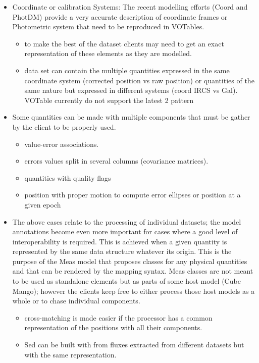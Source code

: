 \begin{itemize}
  \item Coordinate or calibration Systems: The recent modelling efforts (Coord and PhotDM) provide a very accurate description of coordinate frames or Photometric system that need to be reproduced in VOTables.
  \begin{itemize}
    \item to make the best of the dataset  clients may need to get an exact representation of these elements as they are modelled.
    \item data set can contain the multiple quantities expressed in the same coordinate system (corrected position vs raw position) or 
             quantities of the same nature but expressed in different systems (coord IRCS vs Gal). VOTable currently do not support the latest 2 pattern
  \end{itemize} 
  
  \item Some quantities can be made with multiple components that must be gather by the client to be properly used.
  \begin{itemize}
    \item value-error associations. 
    \item errors values split in several columns (covariance matrices). 
    \item quantities with quality flags
    \item position with proper motion to compute error ellipses or position at a given epoch
  \end{itemize} 

  \item The above cases relate to the processing of individual datasets; the model annotations become even more important for cases where a good level of interoperability is required. 
           This is achieved when a given quantity is represented by the same data structure whatever its origin. This is the purpose of the Meas model that proposes classes for 
           any physical quantities and that can be rendered by the mapping syntax. Meas classes are not meant to be used as standalone elements but as parts of some host model (Cube Mango);
           however the clients keep free to either process those host models as a whole or to chase individual components.
    \begin{itemize}
      \item cross-matching is made easier if the processor has a common representation of the positions with all their components.
      \item Sed can be built with from fluxes extracted from different datasets but with the same representation.
   \end{itemize}          


\end{itemize}
